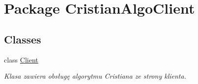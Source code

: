 \hypertarget{namespace_cristian_algo_client}{\section{Package Cristian\+Algo\+Client}
\label{namespace_cristian_algo_client}
}
\subsection*{Classes}
\begin{DoxyCompactItemize}
\item 
class \hyperlink{class_cristian_algo_client_1_1_client}{Client}
\begin{DoxyCompactList}\small\item\em Klasa zawiera obsługę algorytmu Cristiana ze strony klienta. \end{DoxyCompactList}\end{DoxyCompactItemize}
